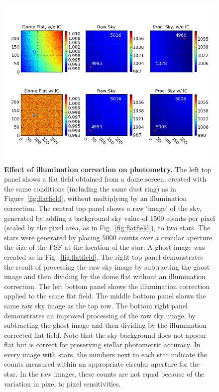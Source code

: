 \documentclass[12pt,preprint]{aastex}
\begin{document}
\begin{figure}[htbp]
\includegraphics[width=6in]{ICeffect}
\caption{ {\small
{\bf Effect of illumination correction on photometry.}
The left top panel shows a flat field obtained from a dome screen,
created with the same conditions (including the same dust ring) as in Figure~\ref{fig:flatfield},
without multiplying by an illumination correction. The central top
panel shows a raw `image' of the sky, generated by adding a background
sky value of 1500 counts per pixel (scaled by the pixel area, as in
Fig.~\ref{fig:flatfield}), to two stars. The stars were generated by
placing 5000 counts over a circular aperture the size of the PSF at
the location of the star. A ghost image was created as in
Fig.~\ref{fig:flatfield}.  The right top panel demonstrates the result
of processing the raw sky image by subtracting the ghost image and
then dividing by the dome flat without an
illumination correction. 
The left bottom panel shows the illumination correction applied to the
same flat field. The middle bottom panel shows the same raw sky image as
the top row. The bottom right panel demonstrates an improved processing
of the raw sky image, by subtracting the ghost image and then dividing
by the illumination corrected flat field. 
Note that the sky background does not appear
flat but is correct for preserving stellar photometric accuracy. 
In every image with stars, the numbers next to each star indicate the
counts measured within an appropriate circular aperture for the
star. In the raw images, these counts are not equal because of the
variation in pixel to pixel sensitivities. }} \label{fig:iceffect} 
\end{figure}
\end{document}
